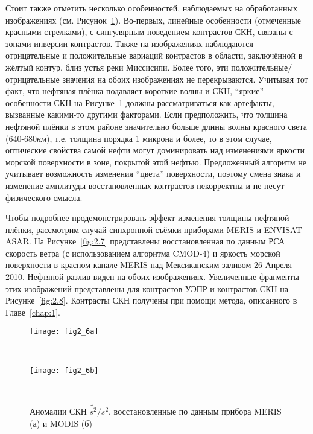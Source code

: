 Стоит также отметить несколько особенностей, наблюдаемых на обработанных изображениях (см. Рисунок~\ref{fig:2.6}). Во-первых, линейные особенности (отмеченные красными стрелками), с сингулярным поведением контрастов СКН, связаны с зонами инверсии контрастов. Также на изображениях наблюдаются отрицательные и положительные вариаций контрастов в области, заключённой в жёлтый контур, близ устья реки Миссисипи. Более того, эти положительные/отрицательные значения на обоих изображениях не перекрываются. Учитывая тот факт, что нефтяная плёнка подавляет короткие волны и СКН, ``яркие'' особенности СКН на Рисунке~\ref{fig:2.6} должны рассматриваться как артефакты, вызванные какими-то другими факторами. Если предположить, что толщина нефтяной плёнки в этом районе значительно больше длины волны красного света (640-680\textit{нм}), т.е. толщина порядка 1 микрона и более, то в этом случае, оптические свойства самой нефти могут доминировать над изменениями яркости морской поверхности в зоне, покрытой этой нефтью. Предложенный алгоритм не учитывает возможность изменения ``цвета'' поверхности, поэтому смена знака и изменение амплитуды восстановленных контрастов некорректны и не несут физического смысла.

Чтобы подробнее продемонстрировать эффект изменения толщины нефтяной плёнки, рассмотрим случай синхронной съёмки приборами MERIS и ENVISAT ASAR. На Рисунке~\ref{fig:2.7} представлены восстановленная по данным РСА скорость ветра (с использованием алгоритма CMOD-4) и яркость морской поверхности в красном канале MERIS над Мексиканским заливом 26 Апреля 2010. Нефтяной разлив виден на обоих изображениях. Увеличенные фрагменты этих изображений представлены для контрастов УЭПР и контрастов СКН на Рисунке~\ref{fig:2.8}. Контрасты СКН получены при помощи метода, описанного в Главе~\ref{chap:1}.



\begin{figure}[H]
   	\centering
	\begin{minipage}{.83\textwidth}
	    \subcaptionbox{\label{fig:2.6a}}
		{\texttt{[image: fig2\_6a]}}
	\end{minipage}
	\hfill
	\\
	\begin{minipage}{.83\textwidth}
	    \subcaptionbox{\label{fig:2.6b}}
		{\texttt{[image: fig2\_6b]}}
	\end{minipage}
    \\
    \caption{Аномалии СКН $\widetilde{s^{2} }/s^{2}$, восстановленные по данным прибора MERIS (а) и MODIS (б)}
    \label{fig:2.6}
\end{figure}


